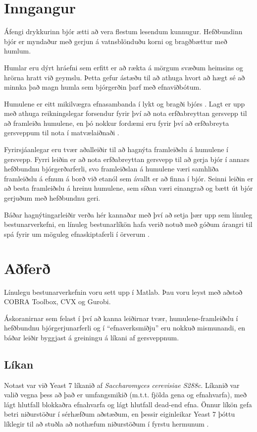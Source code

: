 \documentclass[11pt]{article}
\begin{document}
\vspace{1cm}
\begin{multicols}{2}

\section{Inngangur}
Áfengi drykkurinn bjór ætti að vera flestum lesendum kunnugur. Hefðbundinn bjór er myndaður með gerjun á vatnsblönduðu korni og bragðbættur með humlum.

Humlar eru dýrt hráefni sem erfitt er að rækta á mörgum svæðum heimsins og hrörna hratt við geymslu. Þetta gefur ástæðu til að athuga hvort að hægt sé að minnka það magn humla sem bjórgerðin þarf með efnaviðbótum.

Humulene\cite[KEGG: C09684]{Kanehisa01012000} er eitt mikilvægra efnasambanda í lykt og bragði bjórs \cite{howard1957evaluation}. Lagt er upp með athuga reikningslegar forsendur fyrir því að nota erfðabreyttan gersvepp til að framleiða humulene, en þó nokkur fordæmi eru fyrir því að erfðabreyta gersveppum til nota í matvælaiðnaði \cite{dequin2001potential}.

Fyrirsjáanlegar eru tvær aðalleiðir til að hagnýta framleiðslu á humulene í gersvepp. Fyrri leiðin er að nota erfðabreyttan gersvepp til að gerja bjór í annars hefðbundnu bjórgerðarferli, svo framleiðslan á humulene væri samhliða framleiðslu á efnum á borð við etanól sem ávallt er að finna í bjór. Seinni leiðin er að besta framleiðslu á hreinu humulene, sem síðan væri einangrað og bætt út bjór gerjuðum með hefðbundnu geri.

Báðar hagnýtingarleiðir verða hér kannaðar með því að setja þær upp sem línuleg bestunarverkefni, en línuleg bestunarlíkön hafa verið notuð með góðum árangri til spá fyrir um möguleg efnaskiptaferli í örverum \cite{banga2008optimization,edwards2001silico}.
\section{Aðferð}
Línulegu bestunarverkefnin voru sett upp í Matlab. Þau voru leyst með aðstoð COBRA Toolbox, CVX og Gurobi.

Áskoranirnar sem felast í því að kanna leiðirnar tvær, humulene-framleiðslu í hefðbundnu bjórgerjunarferli og í ``efnaverksmiðju'' eru nokkuð mismunandi, en báðar leiðir byggjast á greiningu á líkani af gersveppnum.
\subsection{Líkan}
Notast var við Yeast 7 líkanið\cite{yeastsf} af \emph{Saccharomyces cerevisiae S288c}. Líkanið var valið vegna þess að það er umfangsmikið (m.t.t. fjölda gena og efnahvarfa), með lágt hlutfall blokkaðra efnahvarfa og lágt hlutfall dead-end efna. Önnur líkön gefa betri niðurstöður í sérhæfðum aðstæðum, en þessir eiginleikar Yeast 7 þóttu líklegir til að stuðla að nothæfum niðurstöðum í fyrstu hermunum \cite{heavner2015comparative}. 

\end{multicols}
\end{document}
